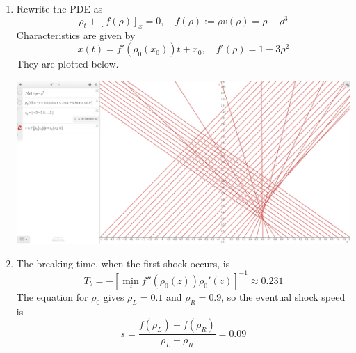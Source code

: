 \documentclass{article}
\newcommand{\sbr}[1]{\left[#1\right]}
\newcommand{\inv}{^{-1}}
\newcommand{\p}{\rho}
\begin{document}
\begin{enumerate}
\begin{enumerate}
	
	\item Rewrite the PDE as
	\[\p_t + [f(\p)]_x = 0,
	\quad f(\p) := \p v(\p) = \p - \p^3\]
	Characteristics are given by
	\[x(t) = f'(\p_0(x_0))t + x_0,
	\quad f'(\p) = 1 - 3\p^2\]
	They are plotted below.
	\begin{center}
		\includegraphics[scale=.3]{final 3a}
	\end{center}


	\item The breaking time, when the first shock occurs, is
	\[T_b = -\sbr{\min_zf''(\p_0(z))\p_0'(z)}\inv \approx 0.231\]
	The equation for $\p_0$ gives $\p_L=0.1$ and $\p_R=0.9$, so the eventual shock speed is
	\[s = \frac{f(\p_L)-f(\p_R)}{\p_L-\p_R} = 0.09\]
	
	
\end{enumerate}



\end{enumerate}
	
	
\end{document}
